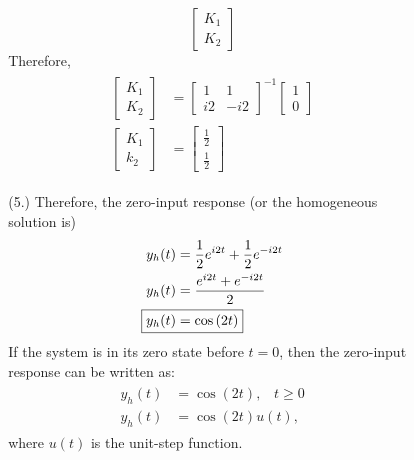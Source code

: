 \documentclass[a4paper, 12pt]{article}
\begin{document}
\begin{itemize}
\begin{itemize}
\begin{itemize}
\begin{itemize}
\begin{equation}
\begin{bmatrix}
K_{1}\\
K_{2}
\end{bmatrix}
\end{equation}
Therefore,
\begin{equation}
\begin{gathered}
\begin{alignedat}{1}
\begin{bmatrix}
K_{1}\\
K_{2}
\end{bmatrix} &=
\begin{bmatrix}
1 & 1 \\
i2 & -i2
\end{bmatrix}^{-1}
\begin{bmatrix}
1 \\
0
\end{bmatrix} \\
\begin{bmatrix}
K_{1} \\
k_{2}
\end{bmatrix} &=
\begin{bmatrix}
\frac{1}{2} \\
\frac{1}{2}
\end{bmatrix}
\end{alignedat}
\end{gathered}
\end{equation}
\item[(5.)]{Therefore, the zero-input response (or the homogeneous solution is)}
\begin{equation}
\begin{gathered}
\begin{alignedat}{1}
y_{h}(t) &= \frac{1}{2}e^{i2t} + \frac{1}{2}e^{-i2t} \\
y_{h}(t) &= \frac{e^{i2t} + e^{-i2t}}{2} \\
\Aboxed{y_{h}(t) &= \cos \left(2 t \right)}
\end{alignedat}
\end{gathered}
\end{equation}
If the system is in its zero state before $t = 0$, then the zero-input response can be written as:
\begin{equation}
\begin{gathered}
\begin{alignedat}{1}
y_{h}(t) &= \cos \left(2 t \right), \;\;\; t \geq 0 \\
y_{h}(t) &= \cos \left(2 t \right) u(t),
\end{alignedat}
\end{gathered}
\end{equation}
where $u(t)$ is the unit-step function.
\end{itemize}
\end{itemize}


\end{itemize}
\end{itemize}
\end{document}
